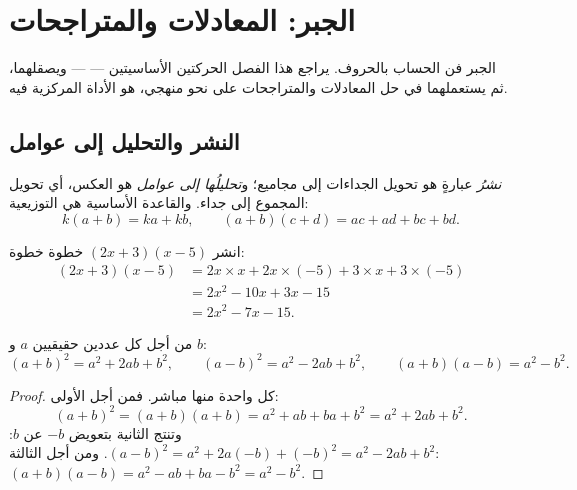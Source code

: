 \chapter{الجبر: المعادلات والمتراجحات}\label{ch:g10:algebra}

الجبر فن الحساب بالحروف. يراجع هذا الفصل الحركتين الأساسيتين ---
  --- ويصقلهما، ثم يستعملهما في حل المعادلات
والمتراجحات على نحو منهجي،  هو الأداة المركزية فيه.

\section{النشر والتحليل إلى عوامل}

\begin{definition}\label{def:g10:algebra:expand}
\emph{نشرُ} عبارةٍ هو تحويل الجداءات إلى
مجاميع؛ و\emph{تحليلُها إلى عوامل} هو العكس،
أي تحويل المجموع إلى جداء. والقاعدة الأساسية هي التوزيعية:
\[
k(a + b) = ka + kb,
\qquad
(a + b)(c + d) = ac + ad + bc + bd .
\]
\end{definition}

\begin{example}\label{ex:g10:algebra:expand}
انشر $(2x + 3)(x - 5)$ خطوة خطوة:
\begin{align*}
(2x + 3)(x - 5)
&= 2x \times x + 2x \times (-5) + 3 \times x + 3 \times (-5) \\
&= 2x^2 - 10x + 3x - 15 \\
&= 2x^2 - 7x - 15 .
\end{align*}
\end{example}

\begin{theorem}\label{thm:g10:algebra:identities}
من أجل كل عددين حقيقيين $a$ و $b$:
\[
(a+b)^2 = a^2 + 2ab + b^2,
\qquad
(a-b)^2 = a^2 - 2ab + b^2,
\qquad
(a+b)(a-b) = a^2 - b^2 .
\]
\end{theorem}

\begin{proof}
كل واحدة منها  مباشر. فمن أجل الأولى:
\[
(a+b)^2 = (a+b)(a+b) = a^2 + ab + ba + b^2 = a^2 + 2ab + b^2 .
\]
وتنتج الثانية بتعويض $-b$ عن $b$: $(a-b)^2 = a^2 + 2a(-b) +
(-b)^2 = a^2 - 2ab + b^2$. ومن أجل الثالثة:
$(a+b)(a-b) = a^2 - ab + ba - b^2 = a^2 - b^2$.
\end{proof}

